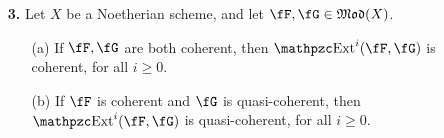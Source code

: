 \documentclass[a4paper]{article}
\begin{document}
\begin{enumerate} [label=\textbf{\arabic*.}, leftmargin=0em]
\begin{proof}
          To prove injectivity, we show $\fF \cong \fI^0 \times_{\fI^1} \fF''$.
          Let $\alpha : \fF \to \fF''$ be the epimorphism from the extension.
          By injectivity of $\fI^0$, there exists a morphism $\beta : \fF \to \fI^0$ that extends $\fF' \to \fI^0$, which induces a morphism $\gamma : \fF'' \to \fI^1$ making the following diagram commute
          \[ \begin{tikzcd}
              0 \arrow[r] & \fF' \arrow[r] \arrow[d, Rightarrow, no head] & \fF \arrow[r] \arrow[d, "\beta"'] & \fF'' \arrow[r] \arrow[d, "\gamma"'] & 0 \\
              0 \arrow[r] & \fF' \arrow[r]                                & \fI^0 \arrow[r]                   & \fJ \arrow[r]                       & 0
            \end{tikzcd}. \]
          The pull-back $\fI^0 \times_{\fI^1} \fF''$ is unique up to unique isomorphism, so it remains to show $\gamma$ is a representative of $\xi$.
          Again, $\Hom(\fF'', \cdot)$ is a covariant $\delta$-functor with $\Hom(\fF'', \fF'') \to \Hom(\fF'', \fJ)$ given by composition with $\gamma$, so $\gamma$ is a representative of $\xi$.

        \end{proof}

  \item[\textbf{3.}] Let $X$ be a Noetherian scheme, and let $\fF, \fG \in \goth{Mod}(X)$.
        \begin{itemize}
          \item[(a)] If $\fF, \fG$ are both coherent, then $\rExt^i(\fF, \fG)$ is coherent, for all $i \geq 0$.
          \item[(b)] If $\fF$ is coherent and $\fG$ is quasi-coherent, then $\rExt^i(\fF, \fG)$ is quasi-coherent, for all $i \geq 0$.
        \end{itemize}


\end{enumerate}
\end{document}
